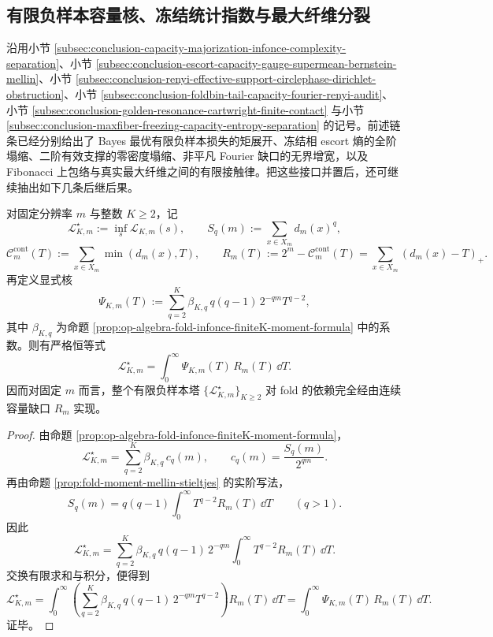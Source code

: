 \subsection{有限负样本容量核、冻结统计指数与最大纤维分裂}\label{subsec:conclusion-infonce-freezing-fourier-maxfiber-three-exponent-splitting}
沿用小节 \ref{subsec:conclusion-capacity-majorization-infonce-complexity-separation}、小节 \ref{subsec:conclusion-escort-capacity-gauge-supermean-bernstein-mellin}、小节 \ref{subsec:conclusion-renyi-effective-support-circlephase-dirichlet-obstruction}、小节 \ref{subsec:conclusion-foldbin-tail-capacity-fourier-renyi-audit}、小节 \ref{subsec:conclusion-golden-resonance-cartwright-finite-contact} 与小节 \ref{subsec:conclusion-maxfiber-freezing-capacity-entropy-separation} 的记号。前述链条已经分别给出了 Bayes 最优有限负样本损失的矩展开、冻结相 escort 熵的全阶塌缩、二阶有效支撑的零密度塌缩、非平凡 Fourier 缺口的无界增宽，以及 Fibonacci 上包络与真实最大纤维之间的有限接触律。把这些接口并置后，还可继续抽出如下几条后继后果。

\begin{theorem}[有限负样本最优对比损失的容量缺口核表示]\label{thm:conclusion-infonce-capacity-gap-kernel-representation}
对固定分辨率 \(m\) 与整数 \(K\ge 2\)，记
\[
\mathcal L_{K,m}^\star:=\inf_s \mathcal L_{K,m}(s),
\qquad
S_q(m):=\sum_{x\in X_m}d_m(x)^q,
\]
\[
\mathcal C_m^{\mathrm{cont}}(T):=\sum_{x\in X_m}\min(d_m(x),T),
\qquad
R_m(T):=2^m-\mathcal C_m^{\mathrm{cont}}(T)=\sum_{x\in X_m}(d_m(x)-T)_+.
\]
再定义显式核
\[
\Psi_{K,m}(T):=
\sum_{q=2}^{K}\beta_{K,q}\,q(q-1)\,2^{-qm}T^{q-2},
\]
其中 \(\beta_{K,q}\) 为命题 \ref{prop:op-algebra-fold-infonce-finiteK-moment-formula} 中的系数。则有严格恒等式
\[
\mathcal L_{K,m}^\star
=
\int_0^\infty \Psi_{K,m}(T)\,R_m(T)\,\dd T.
\]
因而对固定 \(m\) 而言，整个有限负样本塔 \(\{\mathcal L_{K,m}^\star\}_{K\ge 2}\) 对 fold 的依赖完全经由连续容量缺口 \(R_m\) 实现。
\end{theorem}

\begin{proof}
由命题 \ref{prop:op-algebra-fold-infonce-finiteK-moment-formula}，
\[
\mathcal L_{K,m}^\star
=
\sum_{q=2}^{K}\beta_{K,q}\,c_q(m),
\qquad
c_q(m)=\frac{S_q(m)}{2^{qm}}.
\]
再由命题 \ref{prop:fold-moment-mellin-stieltjes} 的实阶写法，
\[
S_q(m)=q(q-1)\int_0^\infty T^{q-2}R_m(T)\,\dd T
\qquad (q>1).
\]
因此
\[
\mathcal L_{K,m}^\star
=
\sum_{q=2}^{K}\beta_{K,q}\,q(q-1)\,2^{-qm}
\int_0^\infty T^{q-2}R_m(T)\,\dd T.
\]
交换有限求和与积分，便得到
\[
\mathcal L_{K,m}^\star
=
\int_0^\infty
\left(
\sum_{q=2}^{K}\beta_{K,q}\,q(q-1)\,2^{-qm}T^{q-2}
\right)R_m(T)\,\dd T
=
\int_0^\infty \Psi_{K,m}(T)\,R_m(T)\,\dd T.
\]
证毕。
\end{proof}

